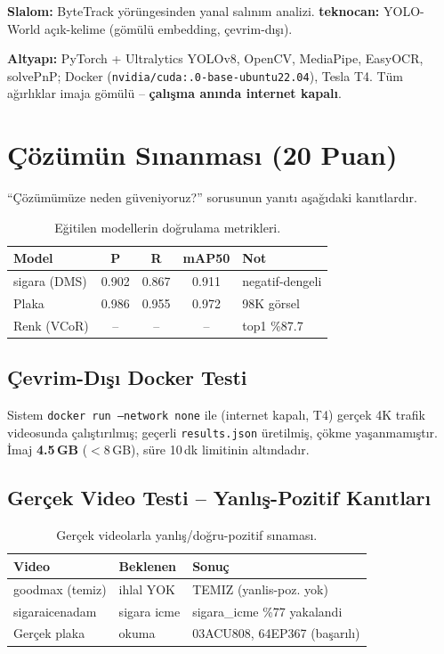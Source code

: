 \documentclass[onecolumn,11pt]{IEEEtran}
\begin{document}
\textbf{Slalom:} ByteTrack yörüngesinden yanal salınım analizi.
\textbf{teknocan:} YOLO-World açık-kelime (gömülü embedding, çevrim-dışı).

\textbf{Altyapı:} PyTorch + Ultralytics YOLOv8, OpenCV, MediaPipe, EasyOCR,
solvePnP; Docker (\texttt{nvidia/cuda:.0\allowbreak -base\allowbreak -ubuntu22.04}), Tesla T4. Tüm
ağırlıklar imaja gömülü -- \textbf{çalışma anında internet kapalı}.

\section{Çözümün Sınanması (20 Puan)}
``Çözümümüze neden güveniyoruz?'' sorusunun yanıtı aşağıdaki kanıtlardır.

\begin{table}[h]
\centering
\caption{Eğitilen modellerin doğrulama metrikleri.}
\label{tab:metrik}
\small
\begin{tabularx}{\columnwidth}{l c c c X}
\toprule
\textbf{Model} & \textbf{P} & \textbf{R} & \textbf{mAP50} & \textbf{Not} \\
\midrule
sigara (DMS) & 0.902 & 0.867 & 0.911 & negatif-dengeli \\
Plaka & 0.986 & 0.955 & 0.972 & 98K görsel \\
Renk (VCoR) & -- & -- & -- & top1 \%87.7 \\
\bottomrule
\end{tabularx}
\end{table}

\subsection{Çevrim-Dışı Docker Testi}
Sistem \texttt{docker run --network none} ile (internet kapalı, T4) gerçek 4K
trafik videosunda çalıştırılmış; geçerli \texttt{results.json} üretilmiş, çökme
yaşanmamıştır. İmaj \textbf{4.5\,GB} ($<$8\,GB), süre 10\,dk limitinin altındadır.

\subsection{Gerçek Video Testi -- Yanlış-Pozitif Kanıtları}
\begin{table}[h]
\centering
\caption{Gerçek videolarla yanlış/doğru-pozitif sınaması.}
\label{tab:gercek}
\small
\begin{tabularx}{\columnwidth}{l X l}
\toprule
\textbf{Video} & \textbf{Beklenen} & \textbf{Sonuç} \\
\midrule
goodmax (temiz) & ihlal YOK & TEMIZ (yanlis-poz. yok) \\
sigaraicenadam & sigara icme & sigara\_icme \%77 yakalandi \\
Gerçek plaka & okuma & 03ACU808, 64EP367 (başarılı) \\
\bottomrule
\end{tabularx}
\end{table}
\end{document}
